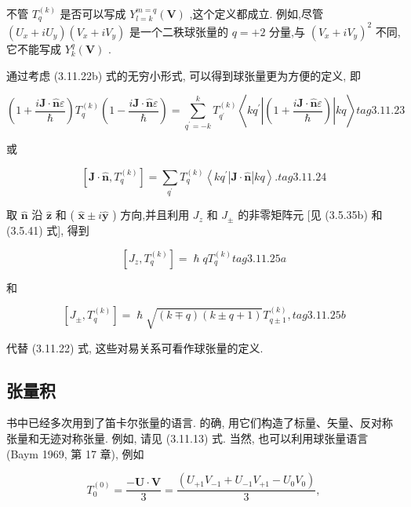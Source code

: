 不管 ${T}_{q}^{\left( k\right) }$ 是否可以写成 ${Y}_{l = k}^{m = q}\left( \mathbf{V}\right)$ ,这个定义都成立. 例如,尽管 $\left( {{U}_{x} + i{U}_{y}}\right) \left( {{V}_{x} + i{V}_{y}}\right)$ 是一个二秩球张量的 $q = + 2$ 分量,与 ${\left( {V}_{x} + i{V}_{y}\right) }^{2}$ 不同,它不能写成 ${Y}_{k}^{q}\left( \mathbf{V}\right)$ .

通过考虑 (3.11.22b) 式的无穷小形式, 可以得到球张量更为方便的定义, 即

$$
\left( {1 + \frac{i\mathbf{J} \cdot \widehat{\mathbf{n}}\varepsilon }{\hslash }}\right) {T}_{q}^{\left( k\right) }\left( {1 - \frac{i\mathbf{J} \cdot \widehat{\mathbf{n}}\varepsilon }{\hslash }}\right) = \mathop{\sum }\limits_{{{q}^{\prime } = - k}}^{k}{T}_{{q}^{\prime }}^{\left( k\right) }\left\langle {k{q}^{\prime }\left| \left( {1 + \frac{i\mathbf{J} \cdot \widehat{\mathbf{n}}\varepsilon }{\hslash }}\right) \right| {kq}}\right\rangle tag{3.11.23}
$$

或

$$
\left\lbrack {\mathbf{J} \cdot \widehat{\mathbf{n}},{T}_{q}^{\left( k\right) }}\right\rbrack = \mathop{\sum }\limits_{{q}^{\prime }}{T}_{q}^{\left( k\right) }\left\langle {k{q}^{\prime }\left| {\mathbf{J} \cdot \widehat{\mathbf{n}}}\right| {kq}}\right\rangle . tag{3.11.24}
$$

取 $\widehat{\mathbf{n}}$ 沿 $\widehat{\mathbf{z}}$ 和 ( $\widehat{\mathbf{x}} \pm i\widehat{\mathbf{y}}$ ) 方向,并且利用 ${J}_{z}$ 和 ${J}_{ \pm }$ 的非零矩阵元 [见 (3.5.35b) 和 (3.5.41) 式], 得到

$$
\left\lbrack {{J}_{z},{T}_{q}^{\left( k\right) }}\right\rbrack = \hslash q{T}_{q}^{\left( k\right) } tag{3.11.25a}
$$

和

$$
\left\lbrack {{J}_{ \pm },{T}_{q}^{\left( k\right) }}\right\rbrack = \hslash \sqrt{\left( {k \mp q}\right) \left( {k \pm q + 1}\right) }{T}_{q \pm 1}^{\left( k\right) }, tag{3.11.25b}
$$

代替 (3.11.22) 式, 这些对易关系可看作球张量的定义.

\subsection{张量积}

书中已经多次用到了笛卡尔张量的语言. 的确, 用它们构造了标量、矢量、反对称张量和无迹对称张量. 例如, 请见 (3.11.13) 式. 当然, 也可以利用球张量语言 (Baym 1969, 第 17 章), 例如

$$
{T}_{0}^{\left( 0\right) } = \frac{-\mathbf{U} \cdot \mathbf{V}}{3} = \frac{\left( {U}_{+1}{V}_{-1} + {U}_{-1}{V}_{+1} - {U}_{0}{V}_{0}\right) }{3},
$$

